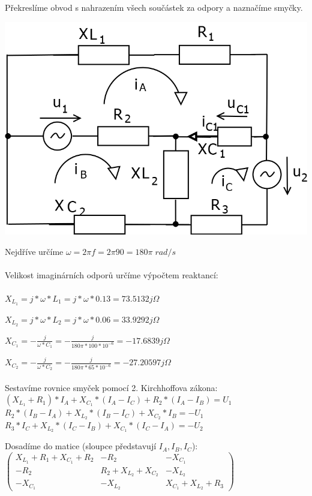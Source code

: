 \documentclass{article}
\begin{document}
\begin{large}
\begin{flushleft}
Překreslíme obvod s nahrazením všech součástek za odpory a naznačíme smyčky.

\begin{center}
    \includegraphics[scale=0.3]{Pr4/Pr4_2.png}
\end{center}
Nejdříve určíme $\omega=2\pi f=2\pi90=180\pi\;rad/s$\\~\\

Velikost imaginárních odporů určíme výpočtem reaktancí:\\~\\
$X_{L_1}=j*\omega*L_1=j*\omega*0.13=73.5132j\Omega$

$X_{L_2}=j*\omega*L_2=j*\omega*0.06=33.9292j\Omega$

$X_{C_1}=-\frac{j}{\omega*C_1}=-\frac{j}{180\pi*100*10^{-6}}=-17.6839j\Omega$

$X_{C_2}=-\frac{j}{\omega*C_2}=-\frac{j}{180\pi*65*10^{-6}}=-27.20597j\Omega$\\~\\

Sestavíme rovnice smyček pomocí 2. Kirchhoffova zákona:\\

$(X_{L_1}+R_1)*I_A+X_{C_1}*(I_A-I_C)+R_2*(I_A-I_B)=U_1$
$R_2*(I_B-I_A)+X_{L_2}*(I_B-I_C)+X_{C_2}*I_B=-U_1$
$R_3*I_C+X_{L_2}*(I_C-I_B)+X_{C_1}*(I_C-I_A)=-U_2$

Dosadíme do matice (sloupce představují $I_A, I_B, I_C$):\\
$\begin{pmatrix}
X_{L_1}+R_1+X_{C_1}+R_2 & -R_2 & -X_{C_1}\\
-R_2 & R_2+X_{L_2}+X_{C_2} & -X_{L_2}\\
-X_{C_1} & -X_{L_2} & X_{C_1}+X_{L_2}+R_3
\end{pmatrix}$\\


\end{flushleft}
\end{large}
\end{document}
